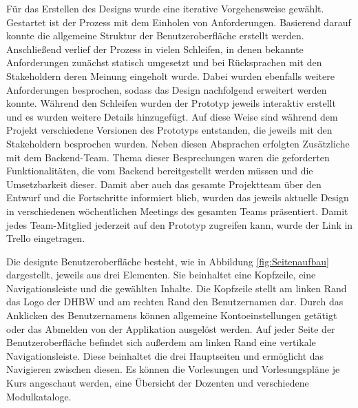 Für das Erstellen des Designs wurde eine iterative Vorgehensweise gewählt.  
Gestartet ist der Prozess mit dem Einholen von Anforderungen.
Basierend darauf konnte die allgemeine Struktur der Benutzeroberfläche erstellt werden.
Anschließend verlief der Prozess in vielen Schleifen, in denen bekannte Anforderungen zunächst statisch umgesetzt und bei Rücksprachen mit den Stakeholdern deren Meinung eingeholt wurde.
Dabei wurden ebenfalls weitere Anforderungen besprochen, sodass das Design nachfolgend erweitert werden konnte.
Während den Schleifen wurden der Prototyp jeweils interaktiv erstellt und es wurden weitere Details hinzugefügt.
Auf diese Weise sind während dem Projekt verschiedene Versionen des Prototyps entstanden, die jeweils mit den Stakeholdern besprochen wurden.
Neben diesen Absprachen erfolgten Zusätzliche mit dem Backend-Team.
Thema dieser Besprechungen waren die geforderten Funktionalitäten, die vom Backend bereitgestellt werden müssen und die Umsetzbarkeit dieser.
Damit aber auch das gesamte Projektteam über den Entwurf und die Fortschritte informiert blieb, wurden das jeweils aktuelle Design in verschiedenen wöchentlichen Meetings des gesamten Teams präsentiert.
Damit jedes Team-Mitglied jederzeit auf den Prototyp zugreifen kann, wurde der Link in Trello eingetragen. 

%
%

Die designte Benutzeroberfläche besteht, wie in Abbildung \ref{fig:Seitenaufbau} dargestellt, jeweils aus drei Elementen.
Sie beinhaltet eine Kopfzeile, eine Navigationsleiste und die gewählten Inhalte.
Die Kopfzeile stellt am linken Rand das Logo der \acs{DHBW} und am rechten Rand den Benutzernamen dar.
Durch das Anklicken des Benutzernamens können allgemeine Kontoeinstellungen getätigt oder das Abmelden von der Applikation ausgelöst werden.
Auf jeder Seite der Benutzeroberfläche befindet sich außerdem am linken Rand eine vertikale Navigationsleiste.
Diese beinhaltet die drei Hauptseiten und ermöglicht das Navigieren zwischen diesen.
Es können die Vorlesungen und Vorlesungspläne je Kurs angeschaut werden, eine Übersicht der Dozenten und verschiedene Modulkataloge. 

